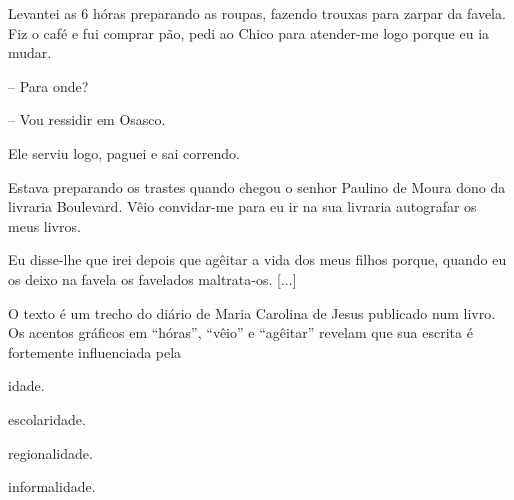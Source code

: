 \begin{myquote}
Levantei as 6 hóras preparando as roupas, fazendo trouxas para zarpar da
favela. Fiz o café e fui comprar pão, pedi ao Chico para atender-me logo
porque eu ia mudar.

-- Para onde?

-- Vou ressidir em Osasco.

Ele serviu logo, paguei e sai correndo.

Estava preparando os trastes quando chegou o senhor Paulino de Moura
dono da livraria Boulevard. Vêio convidar-me para eu ir na sua livraria
autografar os meus livros.

Eu disse-lhe que irei depois que agêitar a vida dos meus filhos porque,
quando eu os deixo na favela os favelados maltrata-os. {[}...{]}
\end{myquote}

O texto é um trecho do diário de Maria Carolina de Jesus publicado num
livro. Os acentos gráficos em ``hóras'', ``vêio'' e ``agêitar'' revelam
que sua escrita é fortemente influenciada pela

\begin{escolha}
\item idade.

\item escolaridade.

\item regionalidade.

\item informalidade.
\end{escolha}